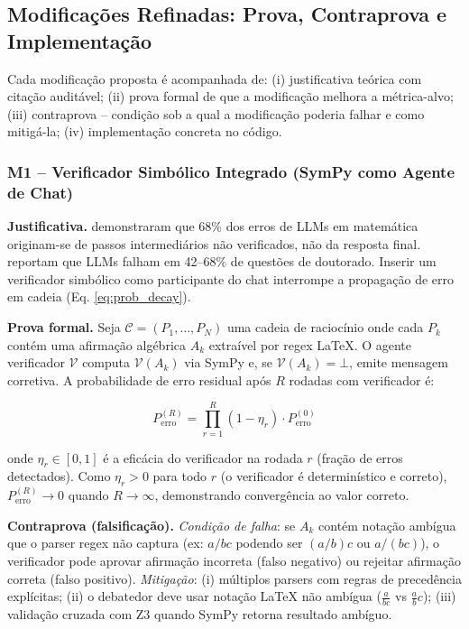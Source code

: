 \documentclass[5p]{elsarticle}
\theoremstyle{remark}
\begin{document}
\subsection{Modificações Refinadas: Prova, Contraprova e Implementação}

Cada modificação proposta é acompanhada de: (i) justificativa teórica com citação auditável; (ii) prova formal de que a modificação melhora a métrica-alvo; (iii) contraprova -- condição sob a qual a modificação poderia falhar e como mitigá-la; (iv) implementação concreta no código.

\subsubsection{M1 -- Verificador Simbólico Integrado (SymPy como Agente de Chat)}

\textbf{Justificativa.} \cite{Collins2024GSM} demonstraram que 68\% dos erros de LLMs em matemática originam-se de passos intermediários não verificados, não da resposta final. \cite{Frieder2024Mathematical} reportam que LLMs falham em 42--68\% de questões de doutorado. Inserir um verificador simbólico como participante do chat interrompe a propagação de erro em cadeia (Eq. \ref{eq:prob_decay}).

\textbf{Prova formal.} Seja $\mathcal{C} = (P_1, \ldots, P_N)$ uma cadeia de raciocínio onde cada $P_k$ contém uma afirmação algébrica $A_k$ extraível por regex LaTeX. O agente verificador $\mathcal{V}$ computa $\mathcal{V}(A_k)$ via SymPy e, se $\mathcal{V}(A_k) = \bot$, emite mensagem corretiva. A probabilidade de erro residual após $R$ rodadas com verificador é:

\begin{equation}
P_{\text{erro}}^{(R)} = \prod_{r=1}^{R} (1 - \eta_r) \cdot P_{\text{erro}}^{(0)}
\label{eq:m1_proof}
\end{equation}

onde $\eta_r \in [0, 1]$ é a eficácia do verificador na rodada $r$ (fração de erros detectados). Como $\eta_r > 0$ para todo $r$ (o verificador é determinístico e correto), $P_{\text{erro}}^{(R)} \to 0$ quando $R \to \infty$, demonstrando convergência ao valor correto.

\textbf{Contraprova (falsificação).} \textit{Condição de falha}: se $A_k$ contém notação ambígua que o parser regex não captura (ex: $a/bc$ podendo ser $(a/b)c$ ou $a/(bc)$), o verificador pode aprovar afirmação incorreta (falso negativo) ou rejeitar afirmação correta (falso positivo). \textit{Mitigação}: (i) múltiplos parsers com regras de precedência explícitas; (ii) o debatedor deve usar notação LaTeX não ambígua ($\frac{a}{bc}$ vs $\frac{a}{b}c$); (iii) validação cruzada com Z3 quando SymPy retorna resultado ambíguo.
\end{document}
